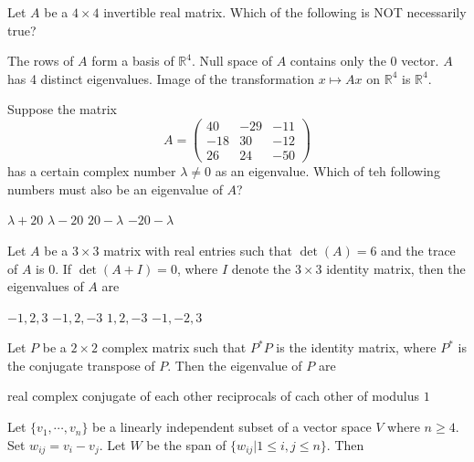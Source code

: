 \documentclass[10pt]{exam}
\newcommand{\R}{\ensuremath{\mathbb{R}}}
\begin{document}
\begin{questions}
\question
Let $A$ be a $4\times 4$ invertible real matrix. Which of the following is NOT necessarily true?

\begin{choices}
\choice The rows of $A$ form a basis of $\R^4$.
\choice Null space of $A$ contains only the $0$ vector.
\choice $A$ has 4 distinct eigenvalues.
\choice Image of the transformation $x \mapsto Ax$ on $\R^4$ is $\R^4$.
\end{choices}


\question
Suppose the matrix 
$$A = \begin{pmatrix}
 40  & -29 & -11 \\ 
-18  &  30 & -12 \\ 
 26  &  24 & -50
\end{pmatrix} $$
has a certain complex number $\lambda \neq 0$ as an eigenvalue. Which of teh following numbers must also be an eigenvalue of $A$?

\begin{oneparchoices}
\choice $\lambda + 20  $
\choice $\lambda - 20  $
\choice $20 - \lambda  $
\choice $- 20 - \lambda$
\end{oneparchoices}


\question
Let $A$ be a $3\times 3$ matrix with real entries such that $\det(A)=6$ and the trace of $A$ is $0$. If $\det(A+I)=0$, where $I$
denote the $3\times 3$ identity matrix, then the eigenvalues of $A$ are

\begin{oneparchoices}
\choice $-1,2,3$
\choice $-1,2,-3$
\choice $1,2,-3$ 
\choice $-1,-2,3$
\end{oneparchoices}

\question
Let $P$ be a $2 \times 2 $ complex matrix such that $ P^* P $ is the identity matrix, where $P^*$ is the conjugate transpose of $P$. Then the eigenvalue of $P$ are 

\begin{choices}
\choice real 
\choice complex conjugate of each other 
\choice reciprocals of cach other 
\choice of modulus $1$ 
\end{choices}

\question
Let $\{v_1,\cdots , v_n\}$ be a linearly independent subset of a vector space $V$ where $n \geq 4$. Set $w_{ij} =v_i-v_j$. Let $W$ be
the span of $\{w_{ij}|1\leq i,j\leq n\}$. Then


\end{questions}
\end{document}
